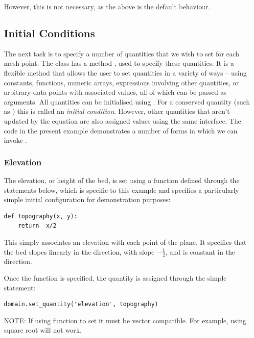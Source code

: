 \documentclass{manual}
\begin{document}
However, this is not necessary, as the above is the default behaviour.

\subsection{Initial Conditions}

The next task is to specify a number of quantities that we wish to
set for each mesh point. The class  has a method
, used to specify these quantities. It is a
flexible method that allows the user to set quantities in a variety
of ways -- using constants, functions, numeric arrays, expressions
involving other quantities, or arbitrary data points with associated
values, all of which can be passed as arguments. All quantities can
be initialised using . For a conserved
quantity (such as ) this is called
an \emph{initial condition}. However, other quantities that aren't
updated by the equation are also assigned values using the same
interface. The code in the present example demonstrates a number of
forms in which we can invoke .

\subsubsection{Elevation}

The elevation, or height of the bed, is set using a function
defined through the statements below, which is specific to this
example and specifies a particularly simple initial configuration
for demonstration purposes:

\begin{verbatim}
def topography(x, y):
    return -x/2
\end{verbatim}

This simply associates an elevation with each point  of
the plane.  It specifies that the bed slopes linearly in the
 direction, with slope $-\frac{1}{2}$,  and is constant in
the  direction.

Once the function  is specified, the quantity
 is assigned through the simple statement:

\begin{verbatim}
domain.set_quantity('elevation', topography)
\end{verbatim}

NOTE: If using function to set  it must be vector
compatible. For example, using square root will not work.
\end{document}
